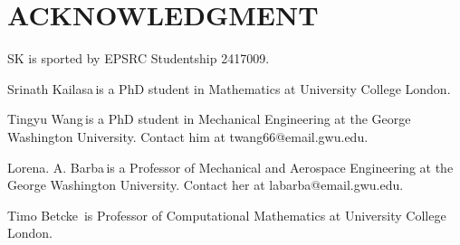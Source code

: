\documentclass{IEEEcsmag}
\begin{document}
\section{ACKNOWLEDGMENT}

SK is sported by EPSRC Studentship 2417009.





\begin{IEEEbiography}{Srinath Kailasa}{\,}is a PhD student in Mathematics at University College London.
\end{IEEEbiography}

\begin{IEEEbiography}{Tingyu Wang}{\,}is a PhD student in Mechanical Engineering at the George Washington University. Contact him at twang66@email.gwu.edu.
\end{IEEEbiography}

\begin{IEEEbiography}{Lorena. A. Barba}{\,}is a Professor of Mechanical and Aerospace Engineering at the George Washington University.  Contact her at labarba@email.gwu.edu.
\end{IEEEbiography}

\begin{IEEEbiography}{Timo Betcke}{\,} is Professor of Computational Mathematics at University College London.
\end{IEEEbiography}
\end{document}
